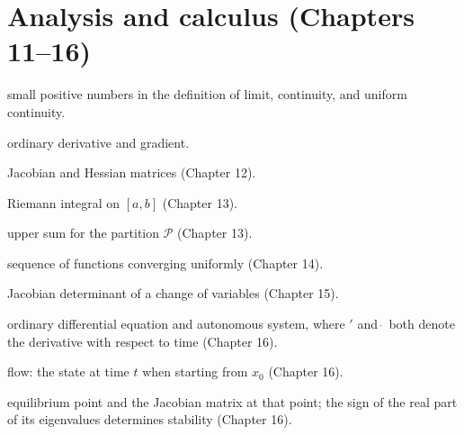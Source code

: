 \section*{Analysis and calculus (Chapters 11--16)}
\begin{description}[style=nextline,itemsep=0.25em]
  \item[$\varepsilon$, $\delta$] small positive numbers in the definition of limit,
        continuity, and uniform continuity.
  \item[$f'(x)$, $\nabla f$] ordinary derivative and gradient.
  \item[$J_f$, $H_f$] Jacobian and Hessian matrices (Chapter 12).
  \item[$\int_a^b f$] Riemann integral on $[a,b]$ (Chapter 13).
  \item[$\sum_{\mathcal{P}} M_i \Delta x_i$] upper sum for the partition
        $\mathcal{P}$ (Chapter 13).
  \item[$f_n \rightrightarrows f$] sequence of functions converging uniformly (Chapter 14).
  \item[$\dfrac{\partial(x,y)}{\partial(u,v)}$] Jacobian determinant of a change of
        variables (Chapter 15).
  \item[$x'=f(t,x)$, $\dot{x}=F(x)$] ordinary differential equation and autonomous
        system, where $'$ and $\dot{\ }$ both denote the derivative with respect to
        time (Chapter 16).
  \item[$\varphi_t(x_0)$] flow: the state at time $t$ when starting from $x_0$
        (Chapter 16).
  \item[$x^{*}$, $J_F(x^{*})$] equilibrium point and the Jacobian matrix at that point;
        the sign of the real part of its eigenvalues determines stability (Chapter 16).
\end{description}

